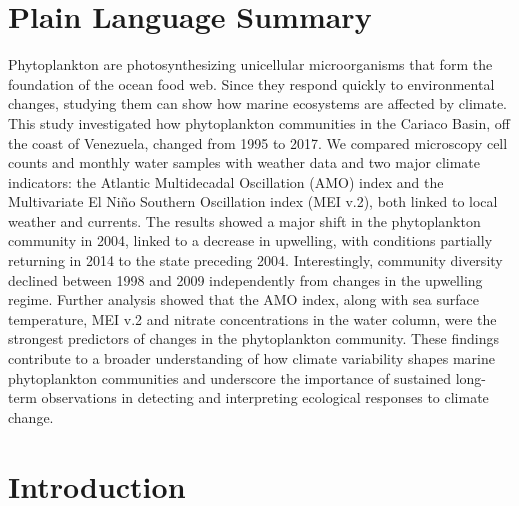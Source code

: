 \documentclass[draft]{agujournal2019}
\begin{document}
\section*{Plain Language Summary}

Phytoplankton are photosynthesizing unicellular microorganisms that form the foundation of the ocean food web. Since they respond quickly to environmental changes, studying them can show how marine ecosystems are affected by climate.
This study investigated how phytoplankton communities in the Cariaco Basin, off the coast of Venezuela, changed from 1995 to 2017. We compared microscopy cell counts and monthly water samples with weather data and two major climate indicators: the Atlantic Multidecadal Oscillation (AMO) index and the Multivariate El Niño Southern Oscillation index (MEI v.2), both linked to local weather and currents.
The results showed a major shift in the phytoplankton community in 2004, linked to a decrease in upwelling, with conditions partially returning in 2014 to the state preceding 2004. Interestingly, community diversity declined between 1998 and 2009 independently from changes in the upwelling regime. Further analysis showed that the AMO index, along with sea surface temperature, MEI v.2 and nitrate concentrations in the water column, were the strongest predictors of changes in the phytoplankton community.
These findings contribute to a broader understanding of how climate variability shapes marine phytoplankton communities and underscore the importance of sustained long-term observations in detecting and interpreting ecological responses to climate change.








\section{Introduction}
%
\end{document}
